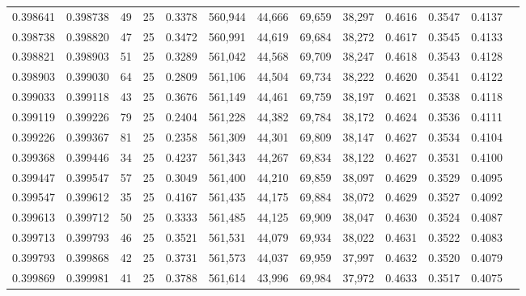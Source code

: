 \begin{tabular}{rrrrrrrrrrrrr}
0.398641 & 0.398738 &    49 &  25 &                                     0.3378 & 560,944 &  44,666 &  69,659 &  38,297 & 0.4616 & 0.3547 & 0.4137 \\
0.398738 & 0.398820 &    47 &  25 &                                     0.3472 & 560,991 &  44,619 &  69,684 &  38,272 & 0.4617 & 0.3545 & 0.4133 \\
0.398821 & 0.398903 &    51 &  25 &                                     0.3289 & 561,042 &  44,568 &  69,709 &  38,247 & 0.4618 & 0.3543 & 0.4128 \\
0.398903 & 0.399030 &    64 &  25 &                                     0.2809 & 561,106 &  44,504 &  69,734 &  38,222 & 0.4620 & 0.3541 & 0.4122 \\
0.399033 & 0.399118 &    43 &  25 &                                     0.3676 & 561,149 &  44,461 &  69,759 &  38,197 & 0.4621 & 0.3538 & 0.4118 \\
0.399119 & 0.399226 &    79 &  25 &                                     0.2404 & 561,228 &  44,382 &  69,784 &  38,172 & 0.4624 & 0.3536 & 0.4111 \\
0.399226 & 0.399367 &    81 &  25 &                                     0.2358 & 561,309 &  44,301 &  69,809 &  38,147 & 0.4627 & 0.3534 & 0.4104 \\
0.399368 & 0.399446 &    34 &  25 &                                     0.4237 & 561,343 &  44,267 &  69,834 &  38,122 & 0.4627 & 0.3531 & 0.4100 \\
0.399447 & 0.399547 &    57 &  25 &                                     0.3049 & 561,400 &  44,210 &  69,859 &  38,097 & 0.4629 & 0.3529 & 0.4095 \\
0.399547 & 0.399612 &    35 &  25 &                                     0.4167 & 561,435 &  44,175 &  69,884 &  38,072 & 0.4629 & 0.3527 & 0.4092 \\
0.399613 & 0.399712 &    50 &  25 &                                     0.3333 & 561,485 &  44,125 &  69,909 &  38,047 & 0.4630 & 0.3524 & 0.4087 \\
0.399713 & 0.399793 &    46 &  25 &                                     0.3521 & 561,531 &  44,079 &  69,934 &  38,022 & 0.4631 & 0.3522 & 0.4083 \\
0.399793 & 0.399868 &    42 &  25 &                                     0.3731 & 561,573 &  44,037 &  69,959 &  37,997 & 0.4632 & 0.3520 & 0.4079 \\
0.399869 & 0.399981 &    41 &  25 &                                     0.3788 & 561,614 &  43,996 &  69,984 &  37,972 & 0.4633 & 0.3517 & 0.4075 \\

\end{tabular}
